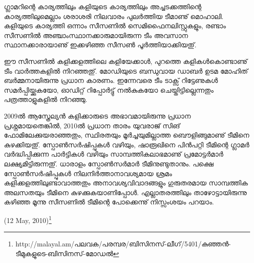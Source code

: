 ഗ്ലാമറിന്റെ കാര്യത്തിലും കളിയുടെ കാര്യത്തിലും അച്ചടക്കത്തിന്റെ കാര്യത്തിലുമെല്ലാം ശരാശരി നിലവാരം പുലര്‍ത്തിയ 
ടീമാണു് മൊഹാലി. കളിയുടെ കാര്യത്തി ഒന്നാം സീസണില്‍ സെമിഫൈനലിസ്റ്റുകളും, രണ്ടാം സീസണില്‍ 
അഞ്ചാംസ്ഥാനക്കാരുമായിരുന്ന ടീം അവസാന സ്ഥാനക്കാരായാണു് ഇക്കഴിഞ്ഞ സീസണ്‍ പൂര്‍ത്തിയാക്കിയതു്.

ഈ സീസണില്‍ കളിക്കളത്തിലെ കളിയേക്കാള്‍, പുറത്തെ കളികള്‍കൊണ്ടാണു് ടീം വാര്‍ത്തകളില്‍ നിറഞ്ഞതു്. 
മോഡിയുടെ ബന്ധുവായ ഡാബര്‍ ഉടമ മോഹിത് ബര്‍മ്മനായിരുന്നു പ്രധാന കാരണം. ഇന്നേവരെ ടീം ടാക്സ് റിട്ടേണുകള്‍ 
സമര്‍പ്പിയ്ക്കുകയോ, ഓഡിറ്റ് റിപ്പോര്‍ട്ടു് നല്‍കുകയോ ചെയ്തിട്ടില്ലെന്നതും പത്രത്താളുകളില്‍ നിറഞ്ഞു.

2009ല്‍ ആസ്ത്രേല്യന്‍ കളിക്കാരുടെ അഭാവമായിരുന്നു പ്രധാന പ്രശ്നമായതെങ്കില്‍, 2010ല്‍ പ്രധാന താരം യുവരാജ് സിങ് 
ഫോമിലേക്കുയരാഞ്ഞതും, സ്ഥിരതയും മൂര്‍ച്ചയുമില്ലാത്ത ബൌളിങ്ങുമാണു് ടീമിനെ കുഴക്കിയതു്. സ്പോണ്‍സര്‍ഷിപ്പുകള്‍ വഴിയും, 
ഷാരൂഖിനെ പിന്‍പറ്റി ടീമിന്റെ ഗ്ലാമര്‍ വര്‍ദ്ധിപ്പിക്കുന്ന പാര്‍ട്ടികള്‍ വഴിയും സാമ്പത്തികലാഭമാണു് പ്രമോട്ടര്‍മാര്‍ ലക്ഷ്യമിട്ടിരുന്നതു്. 
ധാരാളം സ്പോണ്‍സര്‍മാര്‍ ടീമിനുണ്ടുതാനും. പക്ഷെ സ്പോണ്‍സര്‍ഷിപ്പുകള്‍ നിലനിര്‍ത്താനാവശ്യമായ ശ്രമം 
കളിക്കളത്തിലുണ്ടാവാത്തതും അനാവശ്യവിവാദങ്ങളും ഗുരുതരമായ സാമ്പത്തിക അലസതയും ടീമിനെ കുഴക്കുകയാണിപ്പോള്‍. 
എല്ലാതരത്തിലും താഴോട്ടായിരുന്നു കഴിഞ്ഞ മൂന്നു സീസണില്‍ ടീമിന്റെ പോക്കെന്നു് നിസ്സംശയം പറയാം.

\hspace*{2em}(12 May, 2010)\footnote{http://malayal.am/പലവക/പരമ്പര/ബിസിനസ്-ലീഗ്/5401/കുഞ്ഞന്‍-ടീമുകളുടെ-ബിസിനസ്-മോഡല്‍}

\newpage
